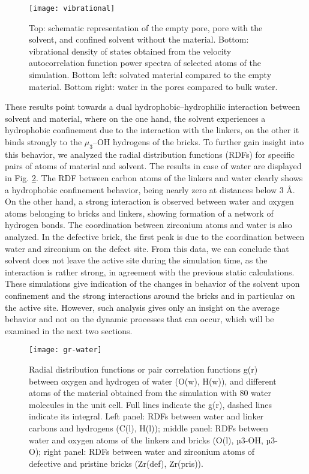\begin{figure}[!htbp]
	\centering
	\texttt{[image: vibrational]}
	\caption{Top: schematic representation of the empty pore, pore with the solvent, and confined solvent without the material. Bottom: vibrational density of states obtained from the velocity autocorrelation function power spectra of selected atoms of the simulation. Bottom left: solvated material compared to the empty material. Bottom right: water in the pores compared to bulk water.}
	\label{fig:vibrational}
\end{figure}
\npar
These results point towards a dual hydrophobic--hydrophilic interaction between solvent and material, where on the one hand, the solvent experiences a hydrophobic confinement due to the interaction with the linkers, on the other it binds strongly to the $\mu_3$--OH hydrogens of the bricks. To further gain insight into this behavior, we analyzed the radial distribution functions (RDFs) for specific pairs of atoms of material and solvent. The results in case of water are displayed in Fig. \ref{fig:gr-water}. The RDF between carbon atoms of the linkers and water clearly shows a hydrophobic  confinement behavior, being nearly zero at distances below 3 \AA. On the other hand, a strong interaction is observed between water and oxygen atoms belonging to bricks and linkers, showing formation of a network of hydrogen bonds. The coordination between zirconium atoms and water is also analyzed. In the defective brick, the first peak is due to the coordination between water and zirconium on the defect site. From this data, we can conclude that solvent does not leave the active site during the simulation time, as the interaction is rather strong, in agreement with the previous static calculations. These simulations give indication of the changes in behavior of the solvent upon confinement and the strong interactions around the bricks and in particular on the active site. However, such analysis gives only an insight on the average behavior and not on the dynamic processes that can occur, which will be examined in the next two sections. 

\begin{figure}[!htbp]
	\centering
	\texttt{[image: gr-water]}
	\caption{Radial distribution functions or pair correlation functions g(r) between oxygen and hydrogen of water (O(w), H(w)), and different atoms of the material obtained from the simulation with 80 water molecules in the unit cell. Full lines indicate the g(r), dashed lines indicate its integral. Left panel: RDFs between water and linker carbons and hydrogens (C(l), H(l)); middle panel: RDFs between water and oxygen atoms of the linkers and bricks (O(l), µ3-OH, µ3-O); right panel: RDFs between water and zirconium atoms of defective and pristine bricks (Zr(def), Zr(pris)). }
	\label{fig:gr-water}
\end{figure}



